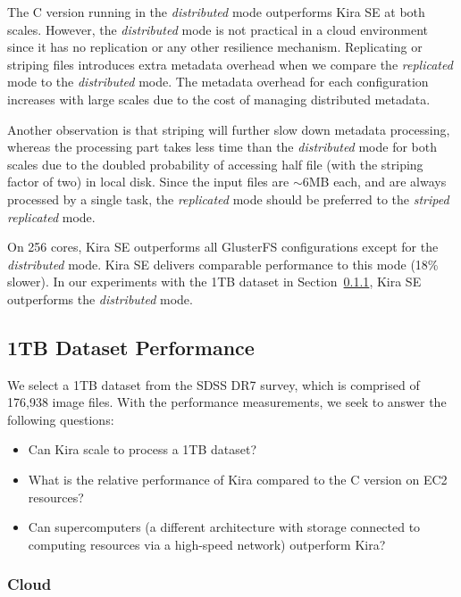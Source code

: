 \documentclass[10pt, conference, compsocconf]{IEEEtran}
\begin{document}
The C version running in the \emph{distributed} mode outperforms Kira SE at both scales. 
However, the \emph{distributed} mode is not practical in a cloud environment since
it has no replication or any other resilience mechanism. Replicating or striping
files introduces extra metadata overhead when we compare the \emph{replicated} mode
to the \emph{distributed} mode. The metadata overhead for each configuration increases
with large scales due to the cost of managing distributed metadata.

Another observation is that striping will further slow down metadata processing, whereas the
processing part takes less time than the \emph{distributed} mode for both scales due
to the doubled probability of accessing half file (with the striping factor of two) in local disk.
Since the input files are $\sim$6MB each, and are always processed by a single task, the
\emph{replicated} mode should be preferred to the \emph{striped replicated} mode.

On 256 cores, Kira SE outperforms all GlusterFS configurations except for the \emph{distributed}
mode. Kira SE delivers comparable performance to this mode (18\% slower). In our
experiments with the 1TB dataset in Section~\ref{sec:1TB-EC2}, Kira SE outperforms
the \emph{distributed} mode.

\subsection{1TB Dataset Performance}
\label{sec:Performance-1TB}

We select a 1TB dataset from the SDSS DR7 survey, which is comprised of 176,938 image files. 
With the performance measurements, we seek to answer the following questions: 

\begin{itemize}
\item Can Kira scale to process a 1TB dataset?
\item What is the relative performance of Kira compared to the C version on EC2 resources?
\item Can supercomputers (a different architecture with storage connected to computing
resources via a high-speed network) outperform Kira?
\end{itemize}

\subsubsection{Cloud}
\label{sec:1TB-EC2}
\end{document}
